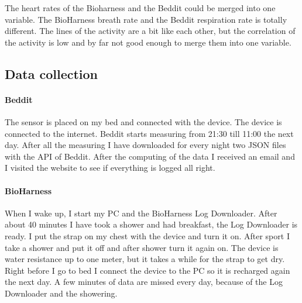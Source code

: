 			The heart rates of the Bioharness and the Beddit could be merged into one variable. The BioHarness breath rate and the Beddit respiration rate is totally different. The lines of the activity are a bit like each other, but the correlation of the activity is low and by far not good enough to merge them into one variable.

	\subsection{Data collection}
		\label{sec:datacollection}
		\paragraph{Beddit}
			The sensor is placed on my bed and connected with the device. The device is connected to the internet. Beddit starts measuring from 21:30 till 11:00 the next day. After all the measuring I have downloaded for every night two JSON files with the API of Beddit\cite{bedditapi}. After the computing of the data I received an email and I visited the website to see if everything is logged all right.
		\paragraph{BioHarness}
			When I wake up, I start my PC and the BioHarness Log Downloader. After about 40 minutes I have took a shower and had breakfast, the Log Downloader is ready. I put the strap on my chest with the device and turn it on. After sport I take a shower and put it off and after shower turn it again on. The device is water resistance up to one meter, but it takes a while for the strap to get dry. Right before I go to bed I connect the device to the PC so it is recharged again the next day. A few minutes of data are missed every day, because of the Log Downloader and the showering. 
